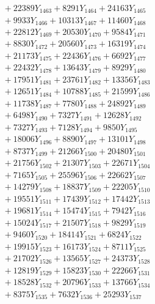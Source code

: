 \documentclass[a4paper,10pt]{article}
\begin{document}
{\begin{align}
&\;  + 22389 Y_{1463} + 8291 Y_{1464} + 24163 Y_{1465} \\[0.3ex]
&\;  + 9933 Y_{1466} + 10313 Y_{1467} + 11460 Y_{1468} \\[0.5ex]\allowbreak
&\;  + 22812 Y_{1469} + 20530 Y_{1470} + 9584 Y_{1471} \\[0.3ex]
&\;  + 8830 Y_{1472} + 20560 Y_{1473} + 16319 Y_{1474} \\[0.3ex]
&\;  + 21173 Y_{1475} + 22436 Y_{1476} + 6692 Y_{1477} \\[0.3ex]
&\;  + 22432 Y_{1478} + 13643 Y_{1479} + 8929 Y_{1480} \\[0.3ex]
&\;  + 17951 Y_{1481} + 23761 Y_{1482} + 13356 Y_{1483} \\[0.3ex]
&\;  + 12651 Y_{1484} + 10788 Y_{1485} + 21599 Y_{1486} \\[0.3ex]
&\;  + 11738 Y_{1487} + 7780 Y_{1488} + 24892 Y_{1489} \\[0.3ex]
&\;  + 6498 Y_{1490} + 7327 Y_{1491} + 12628 Y_{1492} \\[0.3ex]
&\;  + 7327 Y_{1493} + 7128 Y_{1494} + 9850 Y_{1495} \\[0.3ex]
&\;  + 18006 Y_{1496} + 8890 Y_{1497} + 13101 Y_{1498} \\[0.5ex]\allowbreak
&\;  + 8737 Y_{1499} + 21266 Y_{1500} + 20480 Y_{1501} \\[0.3ex]
&\;  + 21756 Y_{1502} + 21307 Y_{1503} + 22671 Y_{1504} \\[0.3ex]
&\;  + 7165 Y_{1505} + 25596 Y_{1506} + 22662 Y_{1507} \\[0.3ex]
&\;  + 14279 Y_{1508} + 18837 Y_{1509} + 22205 Y_{1510} \\[0.3ex]
&\;  + 19551 Y_{1511} + 17439 Y_{1512} + 17442 Y_{1513} \\[0.3ex]
&\;  + 19681 Y_{1514} + 15474 Y_{1515} + 7942 Y_{1516} \\[0.3ex]
&\;  + 15024 Y_{1517} + 21507 Y_{1518} + 9829 Y_{1519} \\[0.3ex]
&\;  + 9460 Y_{1520} + 18414 Y_{1521} + 6824 Y_{1522} \\[0.3ex]
&\;  + 19915 Y_{1523} + 16173 Y_{1524} + 8711 Y_{1525} \\[0.3ex]
&\;  + 21702 Y_{1526} + 13565 Y_{1527} + 24373 Y_{1528} \\[0.5ex]\allowbreak
&\;  + 12819 Y_{1529} + 15823 Y_{1530} + 22266 Y_{1531} \\[0.3ex]
&\;  + 18528 Y_{1532} + 20796 Y_{1533} + 13766 Y_{1534} \\[0.3ex]
&\;  + 8375 Y_{1535} + 7632 Y_{1536} + 25293 Y_{1537} \\[0.3ex]

\end{align}}
\end{document}
